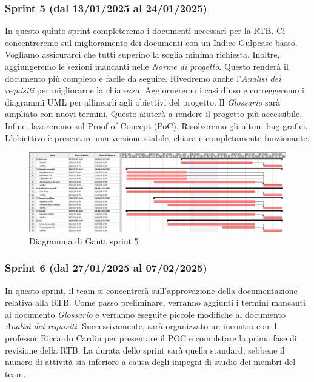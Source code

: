         \subsubsection{Sprint 5 (dal 13/01/2025 al 24/01/2025)}
        In questo quinto sprint completeremo i documenti necessari per la RTB.
        Ci concentreremo sul miglioramento dei documenti con un Indice Gulpease basso. Vogliamo assicurarci che tutti superino la soglia minima richiesta.
        Inoltre, aggiungeremo le sezioni mancanti nelle \textit{Norme di progetto}. Questo renderà il documento più completo e facile da seguire.
        Rivedremo anche l'\textit{Analisi dei requisiti} per migliorarne la chiarezza. Aggiorneremo i casi d'uso e correggeremo i diagrammi UML per allinearli agli obiettivi del progetto.
        Il \textit{Glossario} sarà ampliato con nuovi termini. Questo aiuterà a rendere il progetto più accessibile.
        Infine, lavoreremo sul Proof of Concept (PoC). Risolveremo gli ultimi bug grafici. L'obiettivo è presentare una versione stabile, chiara e completamente funzionante.
                
        \begin{figure}[h!]
            \centering
            \includegraphics[scale = 0.4]{template/images/gantt5.png}
            \caption{Diagramma di Gantt sprint 5}
            \label{fig:3.4} %
        \end{figure}
        \newpage

        \subsubsection{Sprint 6 (dal 27/01/2025 al 07/02/2025)}
        In questo sprint, il team si concentrerà sull'approvazione della documentazione relativa alla RTB. 
        Come passo preliminare, verranno aggiunti i termini mancanti al documento \textit{Glossario} e verranno eseguite piccole modifiche al documento \textit{Analisi dei requisiti}.
        Successivamente, sarà organizzato un incontro con il professor Riccardo Cardin per presentare il POC e completare la prima fase di revisione della RTB. 
        La durata dello sprint sarà quella standard, sebbene il numero di attività sia inferiore a causa degli impegni di studio dei membri del team.
                
